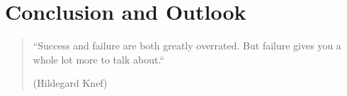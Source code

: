 

\chapter{Conclusion and Outlook} \label{chapter:conclusion}


\begin{quotation}
``Success and failure are both greatly overrated. But failure gives you a whole lot more to talk about.``
\begin{flushright}
(Hildegard Knef)
\end{flushright}
\end{quotation}
